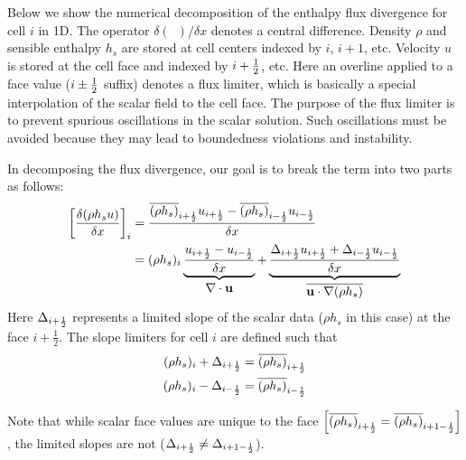 Below we show the numerical decomposition of the enthalpy flux divergence for cell $i$ in 1D.  The operator $\delta(\,\,\,)/\delta x$ denotes a central difference.  Density $\rho$ and sensible enthalpy $h_s$ are stored at cell centers indexed by $i$, $i+1$, etc.  Velocity $u$ is stored at the cell face and indexed by $i+\mbox{$\frac{1}{2}$}$, etc.  Here an overline applied to a face value ($i\pm\mbox{$\frac{1}{2}$}$ suffix) denotes a flux limiter, which is basically a special interpolation of the scalar field to the cell face.  The purpose of the flux limiter is to prevent spurious oscillations in the scalar solution.  Such oscillations must be avoided because they may lead to boundedness violations and instability.

In decomposing the flux divergence, our goal is to break the term into two parts as follows:
\begin{align}
\label{eqn_flux_decomposition}
\left[\frac{\delta (\rho h_s u)}{\delta x}\right]_i &= \frac{ \overline{(\rho h_s)}_{i+\mbox{\tiny $\frac{1}{2}$}} u_{i+\mbox{\tiny $\frac{1}{2}$}} - \overline{(\rho h_s)}_{i-\mbox{\tiny $\frac{1}{2}$}} u_{i-\mbox{\tiny $\frac{1}{2}$}} }{\delta x} \notag\\
&= (\rho h_s)_i \underbrace{\frac{u_{i+\mbox{\tiny $\frac{1}{2}$}}-u_{i-\mbox{\tiny $\frac{1}{2}$}}}{\delta x}}_{\displaystyle\nabla\cdot\mathbf{u}} + \underbrace{\frac{\Delta_{i+\mbox{\tiny $\frac{1}{2}$}} u_{i+\mbox{\tiny $\frac{1}{2}$}} + \Delta_{i-\mbox{\tiny $\frac{1}{2}$}} u_{i-\mbox{\tiny $\frac{1}{2}$}}}{\delta x}}_{\displaystyle\overline{\mathbf{u}\cdot\nabla(\rho h_s)}}
\end{align}
Here $\Delta_{i+\mbox{\tiny $\frac{1}{2}$}}$ represents a limited slope of the scalar data ($\rho h_s$ in this case) at the face $i+\frac{1}{2}$.  The slope limiters for cell $i$ are defined such that
\begin{align}
\label{eqn_slope_1} (\rho h_s)_i + \Delta_{i+\mbox{\tiny $\frac{1}{2}$}} = \overline{(\rho h_s)}_{i+\mbox{\tiny $\frac{1}{2}$}} \\
\label{eqn_slope_2} (\rho h_s)_i - \Delta_{i-\mbox{\tiny $\frac{1}{2}$}} = \overline{(\rho h_s)}_{i-\mbox{\tiny $\frac{1}{2}$}}
\end{align}

Note that while scalar face values are unique to the face $\left[\overline{(\rho h_s)}_{i+\mbox{\tiny $\frac{1}{2}$}} = \overline{(\rho h_s)}_{i+1-\mbox{\tiny $\frac{1}{2}$}}\right]$, the limited slopes are not ($\Delta_{i+\mbox{\tiny $\frac{1}{2}$}} \ne \Delta_{i+1-\mbox{\tiny $\frac{1}{2}$}}$).

